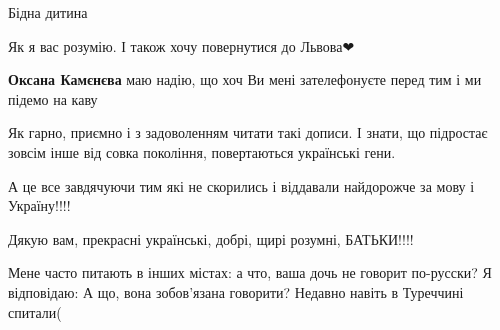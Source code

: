 \begin{itemize}
\begin{itemize}
\end{itemize}

 
Бідна дитина

 
Як я вас розумію. І також хочу повернутися до Львова❤

\begin{itemize}
 
\textbf{Оксана Камєнєва} маю надію, що хоч Ви мені зателефонуєте перед тим і ми підемо на каву
\end{itemize}

 

Як гарно, приємно і з задоволенням читати такі дописи. І знати, що підростає
зовсім інше від совка покоління, повертаються українські гени.

А це все завдячуючи тим які не скорились і віддавали найдорожче за мову і
Україну!!!!

Дякую вам, прекрасні українські, добрі, щирі розумні, БАТЬКИ!!!!


 


Мене часто питають в інших містах: а что, ваша дочь не говорит по-русски? Я
відповідаю: А що, вона зобов'язана говорити? Недавно навіть в Туреччині
спитали(


\end{itemize}
